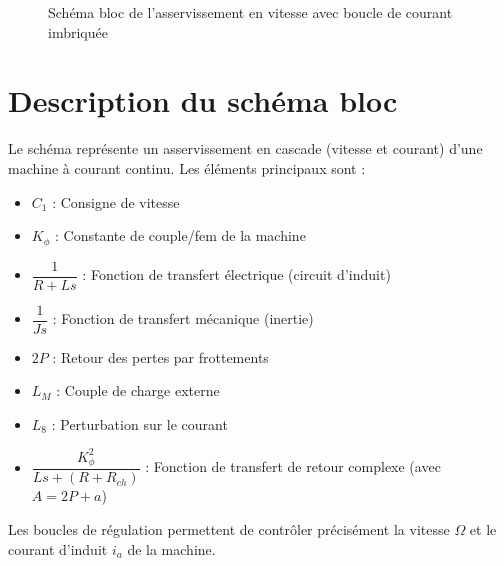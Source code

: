 \begin{figure}[H]
    \caption{Schéma bloc de l'asservissement en vitesse avec boucle de courant imbriquée}
    \label{fig:schema_bloc_asservissement}
\end{figure}

\section{Description du schéma bloc}

Le schéma représente un asservissement en cascade (vitesse et courant) d'une machine à courant continu. Les éléments principaux sont :

\begin{itemize}
    \item \textbf{$C_1$} : Consigne de vitesse
    \item \textbf{$K_\phi$} : Constante de couple/fem de la machine
    \item \textbf{$\dfrac{1}{R+Ls}$} : Fonction de transfert électrique (circuit d'induit)
    \item \textbf{$\dfrac{1}{Js}$} : Fonction de transfert mécanique (inertie)
    \item \textbf{$2P$} : Retour des pertes par frottements
    \item \textbf{$L_M$} : Couple de charge externe
    \item \textbf{$L_8$} : Perturbation sur le courant
    \item \textbf{$\dfrac{K_\phi^2}{Ls+(R+R_{ch})}$} : Fonction de transfert de retour complexe (avec $A = 2P + a$)
\end{itemize}

Les boucles de régulation permettent de contrôler précisément la vitesse $\Omega$ et le courant d'induit $i_a$ de la machine.
